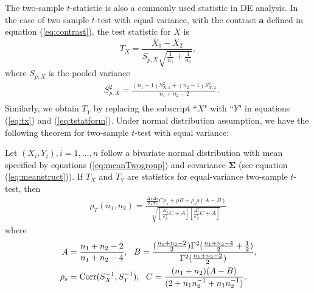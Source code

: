 The two-sample $t$-statistic is also a commonly used statistic in DE 
analysis. In the case of two sample $t$-test with equal variance, with the contrast $\bm a$ 
defined in equation (\ref{eq:contrast}), the test statistic for $X$ is 
\begin{equation}\label{eq:tx}
T_X= \frac{\bar{X}_1- \bar{X}_2}{S_{p, X}\sqrt{\frac{1}{n_1} + \frac{1}{n_2}}},
\end{equation}
where $S_{p, X}$ is the pooled variance
\begin{equation}\label{eq:tstatform}
\begin{aligned}
&S_{p, X}^2 = \frac{(n_1-1)S_{X, 1}^2 + (n_2 -1)S_{X,2}^2}{n_1 + n_2 -2}. \\
\end{aligned}
\end{equation}
Similarly, we obtain $T_Y$ by replacing the subscript ``$X$" with ``$Y$" in equations (\ref{eq:tx}) 
and (\ref{eq:tstatform}). Under normal distribution assumption, we have the following theorem for 
two-sample $t$-test with equal variance:
\begin{theorem}\label{thm:tstat}
	Let $(X_i, Y_i), i = 1, \ldots, n$ follow a bivariate normal distribution with mean 
	specified by equations (\ref{eq:meanTwogroup}) and covariance $\bm \Sigma$ (see equation 
	(\ref{eq:meanstruct})). If $T_X$ and $T_Y$ are statistics for equal-variance two-sample 
	$t$-test, then 
	\begin{equation}\label{eq:ttestcor}
	\begin{aligned}
	\rho_T(n_1, n_2)=   
	\frac{\frac{\Delta_X\Delta_Y}{\sigma_X\sigma_Y}C \rho_{s}+ \rho B
		+ \rho_{s}\rho(A-B)}{\sqrt{\left[ \frac{\Delta_X^2}{\sigma_X^2}C + 
			A\right]\left[\frac{\Delta_Y^2}{\sigma_X^2}C +   A\right]}}
	\end{aligned}
	\end{equation}
	where 
	\begin{equation}\label{eq:AandB}
	\begin{aligned}
	A & = \frac{n_1 + n_2-2}{n_1 + n_2-4}, ~~B =
	\frac{(\frac{n_1 + n_2 -2}{2})\Gamma^2(\frac{n_1 + n_2 -4}{2} + 
		\frac{1}{2})}{\Gamma^2(\frac{n_1+ n_2 -2}{2})}, \\
	\rho_s & = \text{Corr}(S_X^{-1}, S_Y^{-1}), ~~ 
	C = \frac{(n_1 + n_2)(A-B)}{(2 + n_1n_2^{-1} + n_1n_2^{-1})}.
	\end{aligned}
	\end{equation}	 
\end{theorem}
